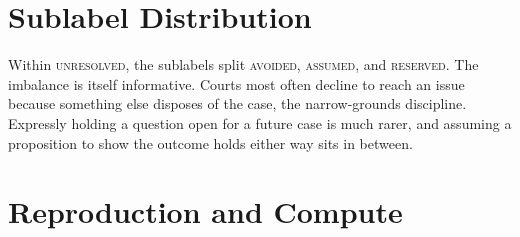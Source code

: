 \section{Sublabel Distribution}

Within \textsc{unresolved}, the sublabels split \ShareAvoided{} \textsc{avoided}, \ShareAssumed{}
\textsc{assumed}, and \ShareReserved{} \textsc{reserved}. The imbalance is itself
informative. Courts most often decline to reach an issue because something else
disposes of the case, the narrow-grounds discipline. Expressly holding a question
open for a future case is much rarer, and assuming a proposition to show
the outcome holds either way sits in between.

\section{Reproduction and Compute}
\label{app:compute}


